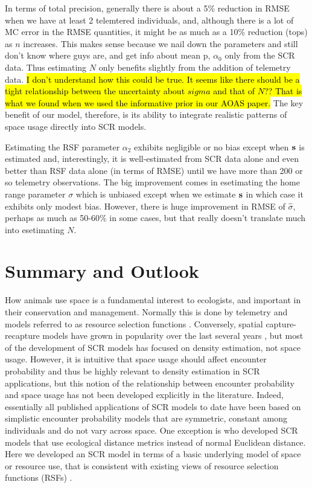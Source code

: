 In terms of total precision, generally there is about a 5\% reduction
in RMSE when we have at least 2 telemtered individuals, and, although
there is a lot of MC error in the RMSE quantities, it might be as much
as a 10\% reduction (tops) as $n$ increases. This makes sense because
we nail down the parameters and still don't know where guys are, and
get info about mean p, $\alpha_{0}$ only from the SCR data. Thus
estimating $N$ only benefits slightly from the addition of telemetry
data.  \hl{I don't understand how this could be true. It seems like
  there should be a tight relationship between the uncertainty about
  $sigma$ and that of $N$?? That is what we found when we used the
  informative prior in our AOAS paper.} The key benefit of our model, therefore, is its ability to
integrate realistic patterns of space usage directly into SCR models.

Estimating the RSF parameter $\alpha_{2}$ exhibits negligible or no
bias except when ${\bf s}$ is estimated and, interestingly, it is
well-estimated from SCR data alone and even better than RSF data alone
(in terms of RMSE) until we have more than 200 or so telemetry
observations.  The big improvement comes in esetimating the home range
parameter $\sigma$ which is unbiased except when we estimate ${\bf s}$
in which case it exhibits only modest bias.  However, there is huge
improvement in RMSE of $\hat{\sigma}$, perhaps as much as 50-60\% in
some cases, but that really doesn't translate much into esetimating
$N$.



\section{Summary and Outlook}


How animals use space is a fundamental interest to ecologists, and
important in their conservation and management. Normally this is done
by telemetry and models referred to as resource selection functions
\citep{manly_etal:2002}.  Conversely, spatial capture-recapture models
have grown in popularity over the last several years
\citep{efford:2004,borchers_efford:2008, royle:2008, efford_etal:2009ecol,royle_etal:2009ecol,
  gardner_etal:2010, gardner_etal:2011, kery_etal:2010,
sollmann_etal:2011,mollet_etal:2012,gopalaswmany_etal:2012}, but
most of the development of SCR models has focused on density
estimation, not space usage.
However, it is intuitive that 
space usage should affect encounter probability and thus be highly
relevant to density estimation in SCR applications, but
this
notion of the relationship between encounter probability and space
usage has not been developed explicitly in the literature.  Indeed,
essentially all published applications of SCR models to date have been
based on simplistic encounter probability models that are symmetric,
constant among individuals and do not vary across space. One exception
is \citet{royle_etal:2012ecol} who developed SCR models that use
ecological distance metrics instead of normal Euclidean distance. Here
we developed an SCR model in terms of a basic underlying model of
space or resource use, that is consistent with existing views of
resource selection functions (RSFs) \citep{manly_etal:2002}.

